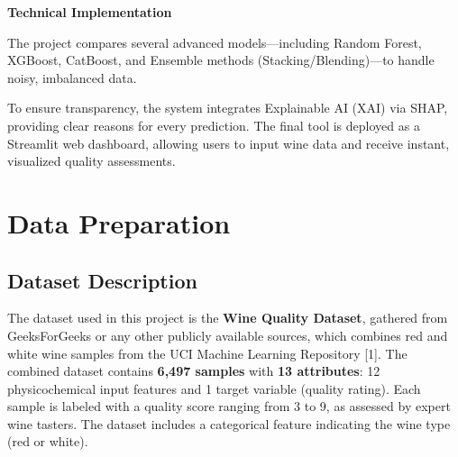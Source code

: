 \documentclass[12pt, a4paper]{article}
\begin{document}
\textbf{Technical Implementation}

The project compares several advanced models---including Random Forest, XGBoost, CatBoost, and Ensemble methods (Stacking/Blending)---to handle noisy, imbalanced data.

To ensure transparency, the system integrates Explainable AI (XAI) via SHAP, providing clear reasons for every prediction. The final tool is deployed as a Streamlit web dashboard, allowing users to input wine data and receive instant, visualized quality assessments.

\section{Data Preparation}

\subsection{Dataset Description}

The dataset used in this project is the \textbf{Wine Quality Dataset}, gathered from GeeksForGeeks or any other publicly available sources, which combines red and white wine samples from the UCI Machine Learning Repository [1]. The combined dataset contains \textbf{6,497 samples} with \textbf{13 attributes}: 12 physicochemical input features and 1 target variable (quality rating). Each sample is labeled with a quality score ranging from 3 to 9, as assessed by expert wine tasters. The dataset includes a categorical feature indicating the wine type (red or white).
\end{document}

